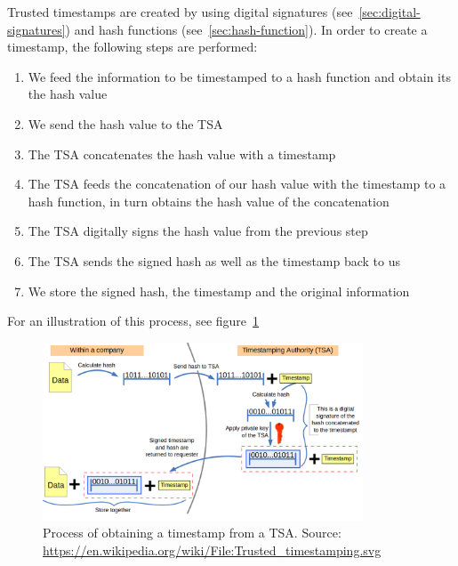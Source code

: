 Trusted timestamps are created by using digital signatures (see~\ref{sec:digital-signatures}) and hash functions (see~\ref{sec:hash-function}).
In order to create a timestamp, the following steps are performed:
\begin{enumerate}
    \item We feed the information to be timestamped to a hash function and obtain its the hash value
    \item We send the hash value to the \gls{TSA}
    \item The \gls{TSA} concatenates the hash value with a timestamp
    \item The \gls{TSA} feeds the concatenation of our hash value with the timestamp to a hash function, in turn obtains the hash value of the concatenation
    \item The \gls{TSA} digitally signs the hash value from the previous step
    \item The \gls{TSA} sends the signed hash as well as the timestamp back to us
    \item We store the signed hash, the timestamp and the original information
\end{enumerate}
For an illustration of this process, see figure~\ref{fig:timestamping}

\begin{figure}
    \centering
    \includegraphics[width=0.85\textwidth]{images/timestamping.png}
    \caption{Process of obtaining a timestamp from a \acrfull{TSA}.
    Source: \url{https://en.wikipedia.org/wiki/File:Trusted_timestamping.svg}}
    \label{fig:timestamping}
\end{figure}

